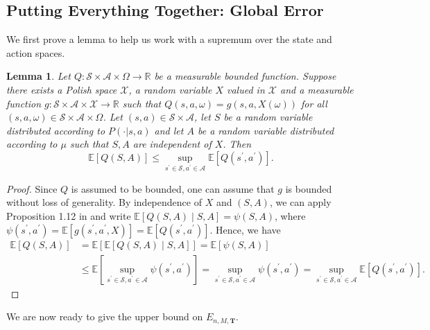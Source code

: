 \documentclass[11pt]{article}
\numberwithin{equation}{section}
\newtheorem{lemma}[theorem]{Lemma}
\theoremstyle{definition}
\theoremstyle{remark}
\def\R{{\mathbb R}}
\newcommand{\citet}{\cite}
\begin{document}
\subsection{Putting Everything Together: Global Error}
\label{subsection:putting-everything-together}
We first prove a lemma to help us work with a supremum over the state and action spaces.
\begin{lemma}
    \label{lemma:from-S-to-sup-s}
    Let $Q: \mathcal S \times \mathcal A \times \Omega \rightarrow \R$ be a measurable bounded function. Suppose there exists a Polish space $\mathcal X$, a random variable $X$ valued in $\mathcal X$ and a measurable function $g: \mathcal S \times \mathcal A \times \mathcal X \rightarrow \R$ such that $Q(s,a, \omega) = g(s,a,X(\omega))$ for all $(s,a,\omega) \in \mathcal S \times \mathcal A \times \Omega$. Let $(s,a) \in \mathcal S \times \mathcal A$, let $S$ be a random variable distributed according to $P(\cdot | s, a)$ and let $A$ be a random variable distributed according to $\mu$ such that $S,A$ are independent of $X$. Then
    \[
        \mathbb E[Q(S,A)] \leq \sup_{s^\prime \in \mathcal S, a^\prime \in \mathcal A} \mathbb E[Q(s^\prime,a^\prime)].
    \]
\end{lemma}
\begin{proof}
	Since $Q$ is assumed to be bounded, one can assume that $g$ is bounded without loss of generality. By independence of $X$ and $(S,A)$, we can apply Proposition 1.12 in \citet{da2014stochastic} and write $\mathbb E[Q(S,A) \mid S,A] = \psi(S,A)$, where $\psi(s^\prime,a^\prime) = \mathbb E[g(s^\prime,a^\prime,X)] = \mathbb E[Q(s^\prime,a^\prime)]$. Hence, we have
	$$
	\begin{aligned}
		\mathbb E [Q(S,A)] &= \mathbb E \left[ \mathbb E [Q(S,A) \mid S,A]\right] 
        = \mathbb E [\psi(S,A)] 
          \\ &\leq \mathbb E \left[\sup_{s^\prime \in \mathcal S, a^\prime \in \mathcal A} \psi(s^\prime,a^\prime)\right] 
				  = \sup_{s^\prime \in \mathcal S, a^\prime \in \mathcal A} \psi(s^\prime,a^\prime) = \sup_{s^\prime \in \mathcal S, a^\prime \in \mathcal A} \mathbb E [Q(s^\prime,a^\prime)].
	\end{aligned}
	$$
\end{proof}
We are now ready to give the upper bound on $E_{n,M,\mathbf T}$.
\end{document}
